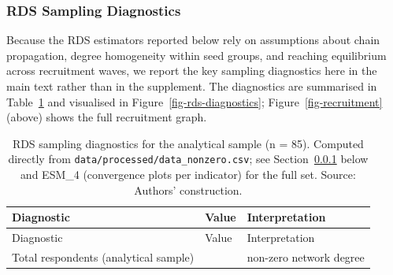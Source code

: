 \documentclass[
  12pt,
  letterpaper,
  DIV=11,
  numbers=noendperiod]{scrartcl}
\begin{document}
\subsubsection{RDS Sampling Diagnostics}\label{sec-rds-diagnostics}

Because the RDS estimators reported below rely on assumptions about
chain propagation, degree homogeneity within seed groups, and reaching
equilibrium across recruitment waves, we report the key sampling
diagnostics here in the main text rather than in the supplement. The
diagnostics are summarised in Table~\ref{tbl-rds-diagnostics} and
visualised in Figure~\ref{fig-rds-diagnostics};
Figure~\ref{fig-recruitment} (above) shows the full recruitment graph.

\begin{longtable}[]{@{}
  >{\raggedright\arraybackslash}p{}
  >{\centering\arraybackslash}p{}
  >{\raggedright\arraybackslash}p{}@{}}
\caption{RDS sampling diagnostics for the analytical sample (n = 85).
Computed directly from \texttt{data/processed/data\_nonzero.csv}; see
Section~\ref{sec-rds-diagnostics} below and ESM\_4 (convergence plots
per indicator) for the full set. Source: Authors'
construction.}\label{tbl-rds-diagnostics}\tabularnewline
\toprule\noalign{}
\begin{minipage}[b]{\linewidth}\raggedright
Diagnostic
\end{minipage} & \begin{minipage}[b]{\linewidth}\centering
Value
\end{minipage} & \begin{minipage}[b]{\linewidth}\raggedright
Interpretation
\end{minipage} \\
\midrule\noalign{}
\endfirsthead
\toprule\noalign{}
\begin{minipage}[b]{\linewidth}\raggedright
Diagnostic
\end{minipage} & \begin{minipage}[b]{\linewidth}\centering
Value
\end{minipage} & \begin{minipage}[b]{\linewidth}\raggedright
Interpretation
\end{minipage} \\
\midrule\noalign{}
\endhead
\bottomrule\noalign{}
\endlastfoot
Total respondents (analytical sample) & 85 & non-zero network degree \\

\end{longtable}
\end{document}
